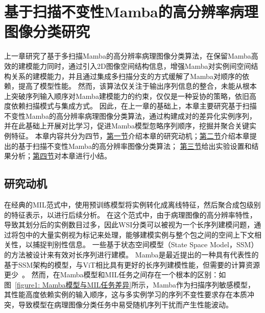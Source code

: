 \chapter[\hspace{0pt}基于扫描不变性Mamba的高分辨率病理图像分类研究]{{\heiti{}\hspace{0pt}基于扫描不变性Mamba的高分辨率病理图像分类研究}}\label{chapter4: 基于扫描不变性Mamba的高分辨率病理图像分类研究}
\removelofgap
\removelotgap

上一章研究了基于多扫描Mamba的高分辨率病理图像分类算法，在保留Mamba高效的建模能力同时，通过引入2D图像空间结构信息，增强Mamba对实例间空间结构关系的建模能力，并且通过集成多扫描分支的方式缓解了Mamba对顺序的依赖，提高了模型性能。
然而，该算法仅关注于输出序列信息的整合，未能从根本上突破序列输入顺序对Mamba建模能力的约束，仅仅是一种妥协的策略，依旧高度依赖扫描模式与集成方式。
因此，在上一章的基础上，本章主要研究基于扫描不变性Mamba的高分辨率病理图像分类算法，通过构建成对的差异化实例序列，并在此基础上开展对比学习，促进Mamba模型忽略序列顺序，挖掘并聚合关键实例特征。
本章内容共分为四节，\hyperref[section4: 研究动机]{第一节}介绍本章的研究动机；\hyperref[section4: 基于序列差异化对比的Mamba模型]{第二节}介绍本章提出的基于扫描不变性Mamba的高分辨率图像分类算法；
\hyperref[section4: 实验设置及结果分析]{第三节}给出实验设置和结果分析；\hyperref[section4: 本章小结]{第四节}对本章进行小结。



\section[\hspace{-2pt}研究动机]{{\heiti{} \hspace{-8pt}研究动机}}\label{section4: 研究动机}

在经典的MIL范式中，使用预训练模型将实例转化成离线特征，然后聚合成包级别的特征表示，以进行后续分析。
在这个范式中，由于病理图像的高分辨率特性，导致其划分后的实例数目过多，因此WSI分类可以被视为一个长序列建模问题，通过将包中的大量实例视为标记来处理，能够建模实例与整个包之间的空间上下文相关性，以捕捉判别性信息。
一些基于状态空间模型（State Space Model，SSM）的方法被设计来有效对长序列进行建模。
Mamba是最近提出的一种具有代表性的基于SSM架构的模型，与ViT相比具有更好的长序列建模性能，但需要的计算资源更少~\cite{zhu2024vision}。
然而，在Mamba模型和MIL任务之间存在一个根本的区别：如图~\ref{figure1: Mamba模型与MIL任务差异}所示，Mamba作为扫描序列敏感模型，其性能高度依赖实例的输入顺序，这与多实例学习的序列不变性要求存在本质冲突，导致模型在病理图像分类任务中易受随机序列干扰而产生性能波动。

